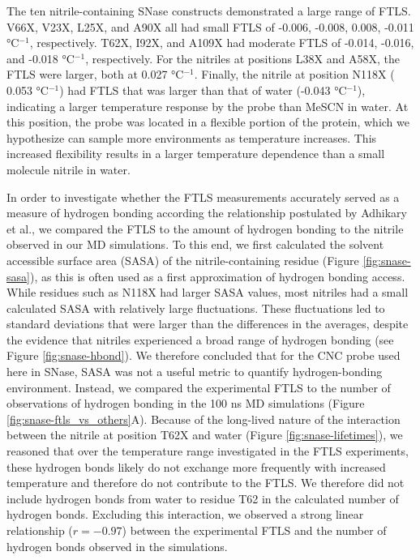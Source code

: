 The ten nitrile-containing SNase constructs demonstrated a large range of FTLS. 
V66X, V23X, L25X, and A90X all had small FTLS of -0.006, -0.008,  0.008, -0.011 \si{\wn} \si{\celsius}$^{-1}$, respectively. 
T62X, I92X, and A109X had moderate FTLS of -0.014, -0.016, and -0.018 \si{\wn} \si{\celsius}$^{-1}$, respectively. 
For the nitriles at positions L38X and A58X, the FTLS were larger, both at  0.027 \si{\wn} \si{\celsius}$^{-1}$. 
Finally, the nitrile at position N118X ( 0.053 \si{\wn} \si{\celsius}$^{-1}$) had FTLS that was larger than that of water (-0.043 \si{\wn} \si{\celsius}$^{-1}$), indicating a larger temperature response by the probe than MeSCN in water. 
At this position, the probe was located in a flexible portion of the protein, which we hypothesize can sample more environments as temperature increases. 
This increased flexibility results in a larger temperature dependence than a small molecule nitrile in water. 

In order to investigate whether the FTLS measurements accurately served as a measure of hydrogen bonding according the relationship postulated by Adhikary et al.\cite{Adhikary2015}, we compared the FTLS to the amount of hydrogen bonding to the nitrile observed in our MD simulations. 
To this end, we first calculated the solvent accessible surface area (SASA) of the nitrile-containing residue (Figure \ref{fig:snase-sasa}), as this is often used as a first approximation of hydrogen bonding access. 
While residues such as N118X had larger SASA values, most nitriles had a small calculated SASA with relatively large fluctuations. 
These fluctuations led to standard deviations that were larger than the differences in the averages, despite the evidence that nitriles experienced a broad range of hydrogen bonding (see Figure \ref{fig:snase-hbond}). 
We therefore concluded that for the CNC probe used here in SNase, SASA was not a useful metric to quantify hydrogen-bonding environment. 
Instead, we compared the experimental FTLS to the number of observations of hydrogen bonding in the 100 ns MD simulations (Figure \ref{fig:snase-ftls_vs_others}A). 
Because of the long-lived nature of the interaction between the nitrile at position T62X and water (Figure \ref{fig:snase-lifetimes}), we reasoned that over the temperature range investigated in the FTLS experiments, these hydrogen bonds likely do not exchange more frequently with increased temperature and therefore do not contribute to the FTLS. 
We therefore did not include hydrogen bonds from water to residue T62 in the calculated number of hydrogen bonds. 
Excluding this interaction, we observed a strong linear relationship ($r = -0.97$) between the experimental FTLS and the number of hydrogen bonds observed in the simulations.

